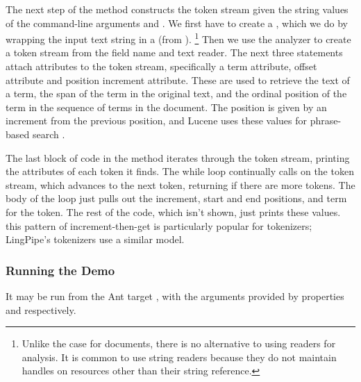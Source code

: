 The next step of the  method constructs the token stream
given the string values of the command-line arguments 
and .  
%
%
We first have to create a , which we do by wrapping the
input text string in a  (from ).%
%
\footnote{Unlike the case for documents, there is no alternative to
  using readers for analysis.  It is common to use string readers
  because they do not maintain handles on resources other than their
  string reference.}
%
Then we use the analyzer to create a token stream from the field name
and text reader.  The next three statements attach attributes to the
token stream, specifically a term attribute, offset attribute and
position increment attribute.  These are used to retrieve the text of
a term, the span of the term in the original text, and the ordinal
position of the term in the sequence of terms in the document.  The
position is given by an increment from the previous position, and
Lucene uses these values for phrase-based search .

The last block of code in the  method iterates through
the token stream, printing the attributes of each token it finds.
%
%
The while loop continually calls  on the token
stream, which advances to the next token, returning  if
there are more tokens.  The body of the loop just pulls out the
increment, start and end positions, and term for the token.  The rest
of the code, which isn't shown, just prints these values.  this
pattern of increment-then-get is particularly popular for tokenizers;
LingPipe's tokenizers use a similar model.  

\subsubsection{Running the Demo}

It may be run from the Ant target , with
the arguments provided by properties  and 
 respectively.

